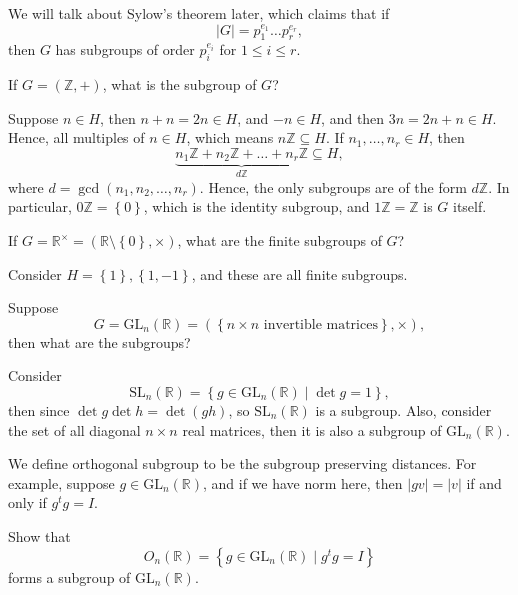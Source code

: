 \begin{note}
    We will talk about Sylow's theorem later, which claims that if
    \[
        \vert G \vert = p_1^{e_1} \dots p_r^{e_r},
    \] then \(G\) has subgroups of order \(p_i^{e_i}\) for \(1 \le i \le r\).  
\end{note}

\begin{eg}
    If \(G=(\mathbb{Z} , +)\), what is the subgroup of \(G\)?
\end{eg}
\begin{explanation}
    Suppose \(n \in H\), then \(n + n = 2n \in H\), and \(-n \in H\), and then \(3n = 2n + n \in H \). Hence, all multiples of \(n \in H\), which means \(n \mathbb{Z} \subseteq H\). If \(n_1, \dots , n_r \in H\), then 
    \[
        \underbrace{n_1 \mathbb{Z} + n_2\mathbb{Z} + \dots + n_r\mathbb{Z}}_{d\mathbb{Z} } \subseteq H,
    \] where \(d = \gcd(n_1, n_2, \dots , n_r)\). Hence, the only subgroups are of the form \(d \mathbb{Z}\). In particular, \(0 \mathbb{Z} = \left\{ 0 \right\} \), which is the identity subgroup, and \(1 \mathbb{Z} = \mathbb{Z} \) is \(G\) itself.       
\end{explanation}

\begin{eg}
    If \(G = \mathbb{R} ^{\times } = (\mathbb{R} \setminus \left\{ 0 \right\}, \times  )\), what are the finite subgroups of \(G\)? 
\end{eg}
\begin{explanation}
    Consider \(H = \left\{ 1 \right\}, \left\{ 1, -1 \right\}  \), and these are all finite subgroups. 
\end{explanation}

\begin{eg}
    Suppose 
    \[
        G = \mathrm{GL}_n(\mathbb{R}) = \left( \left\{ n \times n \text{ invertible matrices} \right\}, \times \right),  
    \] then what are the subgroups?
\end{eg}
\begin{explanation}
    Consider 
    \[
        \mathrm{SL}_n(\mathbb{R} ) = \left\{ g \in \mathrm{GL}_n(\mathbb{R} ) \mid \det g = 1 \right\},  
    \] then since \(\det g \det h = \det (gh)\), so \(\mathrm{SL}_n(\mathbb{R} ) \) is a subgroup. Also, consider the set of all diagonal \(n \times n\) real matrices, then it is also a subgroup of \(\mathrm{GL}_n(\mathbb{R} ) \).    
\end{explanation}

\begin{remark}
    We define orthogonal subgroup to be the subgroup preserving distances. For example, suppose \(g \in \mathrm{GL}_n(\mathbb{R} ) \), and if we have norm here, then \(\vert gv \vert = \vert v \vert  \) if and only if \(g^t g = I\).  
\end{remark}

\begin{exercise}
    Show that 
    \[
        O_n(\mathbb{R} ) = \left\{ g \in \mathrm{GL}_n(\mathbb{R} ) \mid g^t g = I\right\} 
    \] forms a subgroup of \(\mathrm{GL}_n(\mathbb{R} ) \). 
\end{exercise}

